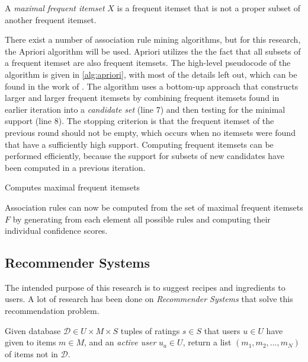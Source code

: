 \begin{definition}
	A \emph{maximal frequent itemset} $X$ is a frequent itemset that is not a proper subset of another frequent itemset.
\end{definition}

There exist a number of association rule mining algorithms, but for this research, the Apriori algorithm will be used.
Apriori utilizes the the fact that all subsets of a frequent itemset are also frequent itemsets.
The high-level pseudocode of the algorithm is given in \cref{alg:apriori}, with most of the details left out, which can be found in the work of \cite{Agrawal1993}.
The algorithm uses a bottom-up approach that constructs larger and larger frequent itemsets by combining frequent itemsets found in earlier iteration into a \emph{candidate set} (line $7$) and then testing for the minimal support (line $8$).
The stopping criterion is that the frequent itemset of the previous round should not be empty, which occurs when no itemsets were found that have a sufficiently high support.
Computing frequent itemsets can be performed efficiently, because the support for subsets of new candidates have been computed in a previous iteration.

\begin{algorithm}[htbp]
	\caption{Computes maximal frequent itemsets}
	\label{alg:apriori}
	
\end{algorithm}

Association rules can now be computed from the set of maximal frequent itemsets $F$ by generating from each element all possible rules and computing their individual confidence scores.




\subsection{Recommender Systems}
\label{subsec:recommender_systems}

The intended purpose of this research is to suggest recipes and ingredients to users.
A lot of research has been done on \emph{Recommender Systems} that solve this recommendation problem.

\begin{definition}
	Given database $\mathcal{D} \in U \times M \times S$ tuples of ratings $s\in S$ that users $u \in U$ have given to items $m \in M$, and an \emph{active user} $u_a \in U$, return a list $(m_1, m_2, \dots, m_N)$ of items not in $\mathcal{D}$.
\end{definition}

